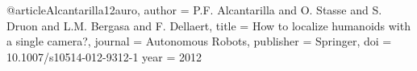 
@article{Alcantarilla12auro,
 author = {P.F. Alcantarilla and O. Stasse and S. Druon and L.M. Bergasa and F. Dellaert},
 title = {How to localize humanoids with a single camera?},
 journal = {Autonomous Robots},
 publisher = {Springer},
 doi = {10.1007/s10514-012-9312-1}
 year = {2012}
 }
